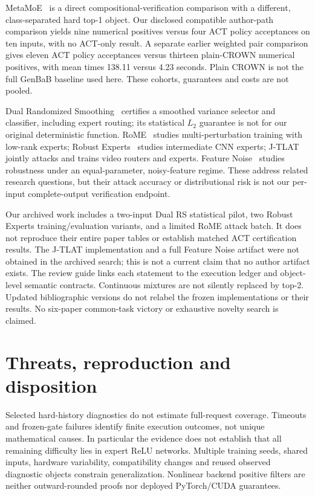 \documentclass[11pt]{article}
\begin{document}
MetaMoE~\cite{metamoe} is a direct compositional-verification comparison with
a different, class-separated hard top-1 object. Our disclosed compatible
author-path comparison yields nine numerical positives versus four ACT policy
acceptances on ten inputs, with no ACT-only result. A separate earlier weighted
pair comparison gives eleven ACT policy acceptances versus thirteen plain-CROWN
numerical positives, with mean times 138.11 versus 4.23 seconds. Plain CROWN is
not the full GenBaB baseline used here. These cohorts, guarantees and costs are
not pooled.

Dual Randomized Smoothing~\cite{dualrs} certifies a smoothed variance selector
and classifier, including expert routing; its statistical $L_2$ guarantee is
not for our original deterministic function. RoME~\cite{rome} studies
multi-perturbation training with low-rank experts; Robust Experts~\cite{robustexperts}
studies intermediate CNN experts; J-TLAT~\cite{jtlat} jointly attacks and trains
video routers and experts. Feature Noise~\cite{featurenoise} studies robustness
under an equal-parameter, noisy-feature regime. These address related research
questions, but their attack accuracy or distributional risk is not our
per-input complete-output verification endpoint.

Our archived work includes a two-input Dual RS statistical pilot, two
Robust Experts training/evaluation variants, and a limited RoME attack batch.
It does not reproduce their entire paper tables or establish matched ACT
certification results. The J-TLAT implementation and a full Feature Noise
artifact were not obtained in the archived search; this is not a current claim
that no author artifact exists. The review guide links each statement to the
execution ledger and object-level semantic contracts. Continuous mixtures are
not silently replaced by top-2. Updated bibliographic versions do not relabel
the frozen implementations or their results. No six-paper common-task victory
or exhaustive novelty search is claimed.

\section{Threats, reproduction and disposition}
Selected hard-history diagnostics do not estimate full-request coverage.
Timeouts and frozen-gate failures identify finite execution outcomes, not unique
mathematical causes. In particular the evidence does not establish that all
remaining difficulty lies in expert ReLU networks. Multiple training seeds,
shared inputs, hardware variability, compatibility changes and reused observed
diagnostic objects constrain generalization. Nonlinear backend positive filters
are neither outward-rounded proofs nor deployed PyTorch/CUDA guarantees.
\end{document}

